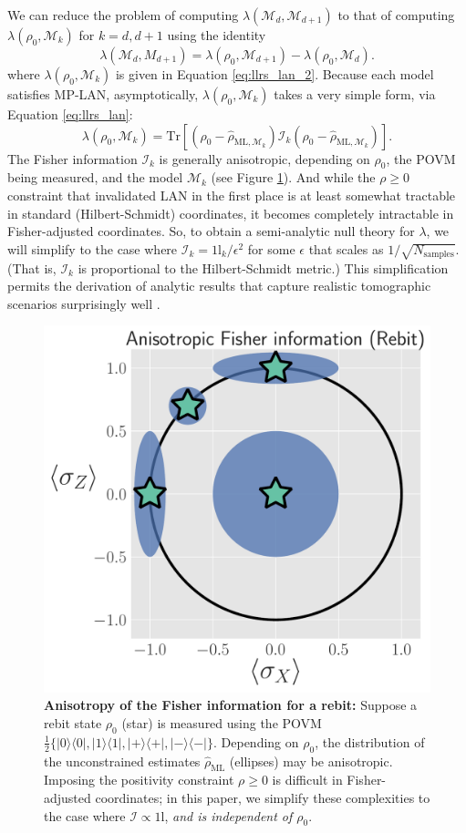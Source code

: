 \documentclass[aps,pra, twocolumn]{revtex4-1}
\newcommand{\M}{\mathcal{M}}
\newcommand{\Id}{\mathbb{I}}
\def\Id{1\!\mathrm{l}}
\newcommand{\rhohat}{\hat{\rho}}
\newcommand{\rhoML}[1]{\rhohat_{\scriptscriptstyle{\mathrm{ML},#1}}}
\begin{document}
We can reduce the problem of computing $\lambda(\M_{d}, \M_{d+1})$ to that of computing $\lambda(\rho_{0}, \M_{k})$ for $k = d, d+1$ using the identity
\[\lambda(\M_{d}, M_{d+1}) = \lambda(\rho_{0}, \M_{d+1}) - \lambda(\rho_{0}, \M_{d}).\]
where $\lambda(\rho_{0}, \M_{k})$ is given in Equation \eqref{eq:llrs_lan_2}.
Because each model satisfies MP-LAN, asymptotically, $\lambda(\rho_{0}, \M_{k})$ takes a very simple form, via Equation \eqref{eq:llrs_lan}:
\[\lambda(\rho_{0}, \M_{k}) = \mathrm{Tr}[(\rho_{0} - \rhoML{\M_{k}})\mathcal{I}_{k}(\rho_{0} - \rhoML{\M_{k}})].\]
The Fisher information $\mathcal{I}_{k}$ is generally anisotropic,  depending on $\rho_{0}$, the POVM being measured, and the model $\M_{k}$ (see Figure \ref{fig:anisofi}). And while the $\rho\geq0$ constraint  that invalidated LAN in the first place is at least somewhat tractable in standard (Hilbert-Schmidt) coordinates, it becomes completely intractable in Fisher-adjusted coordinates.  So, to obtain a semi-analytic null theory for $\lambda$, we will simplify to the case where   $\mathcal{I}_{k} = \Id_{k}/\epsilon^{2} $ for some $\epsilon$ that scales as $1/\sqrt{N_{\mathrm{samples}}}$. (That is, $\mathcal{I}_{k}$ is proportional to the Hilbert-Schmidt metric.) This simplification permits the derivation of analytic results that capture realistic tomographic scenarios surprisingly well \cite{Smolin2012}.
\begin{figure}
\includegraphics[width=.85\columnwidth]{Images/Figure_5.pdf}
 \caption{\textbf{Anisotropy of the Fisher information for a rebit:} Suppose a rebit state $\rho_{0}$ (star) is measured using the POVM $\frac{1}{2}\{|0\rangle\langle 0|, |1\rangle\langle 1|, |+\rangle\langle +|, |-\rangle\langle -|\}$. Depending on $\rho_{0}$, the distribution of the unconstrained estimates $\hat{\rho}_{\mathrm{ML}}$ (ellipses) may be anisotropic. Imposing the positivity constraint $\rho \geq 0$ is difficult in Fisher-adjusted coordinates; in this paper, we simplify these complexities to the case where $\mathcal{I} \propto \Id$, \emph{and is independent of $\rho_{0}$}.}
\label{fig:anisofi}
\end{figure}
\end{document}
